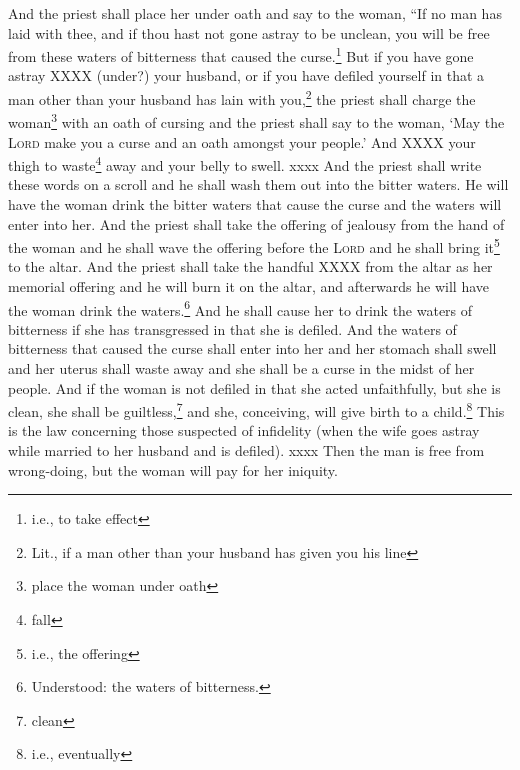 \begin{enumerate}[align=center]
     And the priest shall place her under oath and say to the woman, ``If no man has laid with thee, and if thou hast not gone astray to be unclean, you will be free from these waters of bitterness that caused the curse.\footnote{i.e., to take effect}%
     But if you have gone astray XXXX (under?) your husband, or if you have defiled yourself in that a man other than your husband has lain with you,\footnote{Lit., if a man other than your husband has given you his line}%
     the priest shall charge the woman\footnote{place the woman under oath} with an oath of cursing and the priest shall say to the woman, `May the \textsc{Lord} make you a curse and an oath amongst your people.' And XXXX your thigh to waste\footnote{fall} away and your belly to swell.%
     xxxx%
     And the priest shall write these words on a scroll and he shall wash them out into the bitter waters.%
     He will have the woman drink the bitter waters that cause the curse and the waters will enter into her.%
     And the priest shall take the offering of jealousy from the hand of the woman and he shall wave the offering before the \textsc{Lord} and he shall bring it\footnote{i.e., the offering} to the altar.%
     And the priest shall take the handful XXXX from the altar as her memorial offering and he will burn it on the altar, and afterwards he will have the woman drink the waters.\footnote{Understood: the waters of bitterness.}%
     And he shall cause her to drink the waters of bitterness if she has transgressed in that she is defiled. And the waters of bitterness that caused the curse shall enter into her and her stomach shall swell and her uterus shall waste away and she shall be a curse in the midst of her people.%
     And if the woman is not defiled in that she acted unfaithfully, but she is clean, she shall be guiltless,\footnote{clean} and she, conceiving, will give birth to a child.\footnote{i.e., eventually}%
     This is the law concerning those suspected of infidelity (when the wife goes astray while married to her husband and is defiled).%
     xxxx%
     Then the man is free from wrong-doing, but the woman will pay for her iniquity.%
\end{enumerate}
